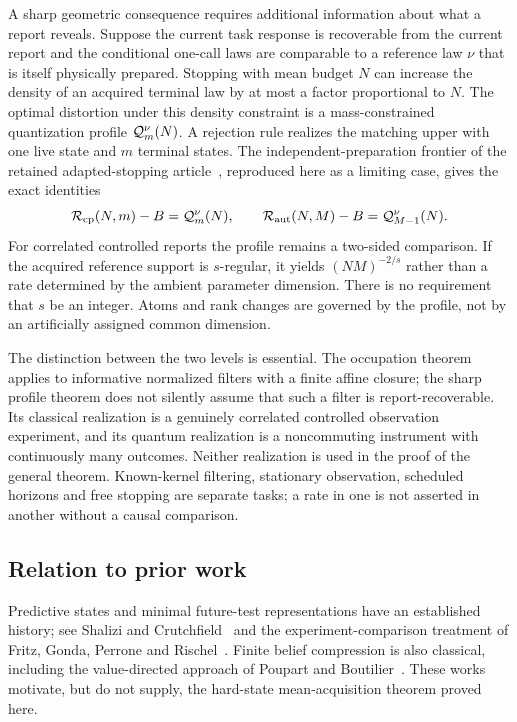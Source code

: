 A sharp geometric consequence requires additional information about what a report reveals. Suppose the current task response is recoverable from the current report and the conditional one-call laws are comparable to a reference law $\nu$ that is itself physically prepared. Stopping with mean budget $N$ can increase the density of an acquired terminal law by at most a factor proportional to $N$. The optimal distortion under this density constraint is a mass-constrained quantization profile $\mathcal Q_m^\nu(N)$. A rejection rule realizes the matching upper with one live state and $m$ terminal states. The independent-preparation frontier of the retained adapted-stopping article~\cite{GTFStopped}, reproduced here as a limiting case, gives the exact identities
\begin{equation}\label{eq:intro-exact}
 \mathcal R_{\mathrm{cp}}(N,m)-B=\mathcal Q_m^\nu(N),\qquad
 \mathcal R_{\mathrm{aut}}(N,M)-B=\mathcal Q_{M-1}^\nu(N).
\end{equation}
For correlated controlled reports the profile remains a two-sided comparison. If the acquired reference support is $s$-regular, it yields $(NM)^{-2/s}$ rather than a rate determined by the ambient parameter dimension. There is no requirement that $s$ be an integer. Atoms and rank changes are governed by the profile, not by an artificially assigned common dimension.

The distinction between the two levels is essential. The occupation theorem applies to informative normalized filters with a finite affine closure; the sharp profile theorem does not silently assume that such a filter is report-recoverable. Its classical realization is a genuinely correlated controlled observation experiment, and its quantum realization is a noncommuting instrument with continuously many outcomes. Neither realization is used in the proof of the general theorem. Known-kernel filtering, stationary observation, scheduled horizons and free stopping are separate tasks; a rate in one is not asserted in another without a causal comparison.

\subsection*{Relation to prior work}
Predictive states and minimal future-test representations have an established history; see Shalizi and Crutchfield~\cite{SC} and the experiment-comparison treatment of Fritz, Gonda, Perrone and Rischel~\cite{FGPR}. Finite belief compression is also classical, including the value-directed approach of Poupart and Boutilier~\cite{PB}. These works motivate, but do not supply, the hard-state mean-acquisition theorem proved here.

